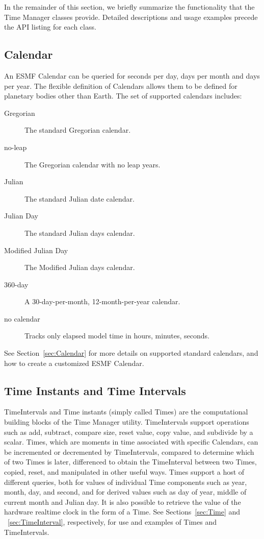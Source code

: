 \newpage
In the remainder of this section, we briefly summarize the 
functionality that the Time Manager classes provide.  Detailed 
descriptions and usage examples precede the API listing for each 
class.

\subsection{Calendar}
An ESMF Calendar can be queried for seconds per day, days per month 
and days per year.  The flexible definition of Calendars allows them
to be defined for planetary bodies other than Earth.  The set of supported 
calendars includes:
\begin{description}
\item [Gregorian] The standard Gregorian calendar.
\item [no-leap] The Gregorian calendar with no leap years.
\item [Julian] The standard Julian date calendar.
\item [Julian Day] The standard Julian days calendar.
\item [Modified Julian Day] The Modified Julian days calendar.
\item [360-day] A 30-day-per-month, 12-month-per-year calendar.
\item [no calendar] Tracks only elapsed model time in hours, minutes, seconds.
\end{description}
See Section~\ref{sec:Calendar} for more details on supported standard 
calendars, and how to create a customized ESMF Calendar.

\subsection{Time Instants and Time Intervals}

TimeIntervals and Time instants (simply called Times) are the computational 
building blocks of the Time Manager utility.  TimeIntervals support operations
such as add, subtract, compare size, reset value, copy value, and subdivide
by a scalar.  Times, which are moments in time associated with specific
Calendars, can be incremented or decremented by TimeIntervals, compared to
determine which of two Times is later, differenced to obtain the TimeInterval
between two Times, copied, reset, and manipulated in other useful ways.
Times support a host of different queries, both for values of individual Time 
components such as year, month, day, and second, and for derived values such 
as day of year, middle of current month and Julian day.  It is also possible 
to retrieve the value of the hardware realtime clock in the form of a 
Time.  See Sections~\ref{sec:Time} and ~\ref{sec:TimeInterval}, respectively,
for use and examples of Times and TimeIntervals.


